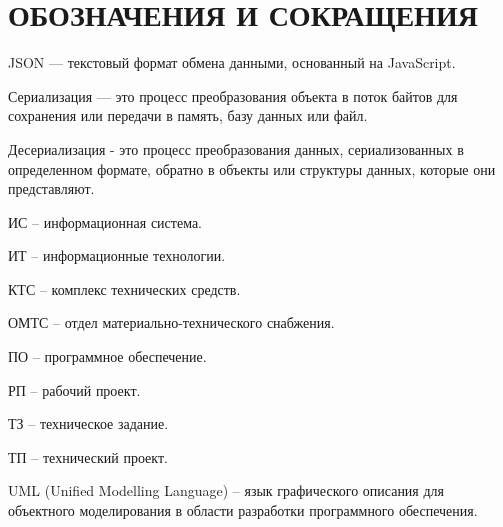 \section*{ОБОЗНАЧЕНИЯ И СОКРАЩЕНИЯ}

JSON — текстовый формат обмена данными, основанный на JavaScript.

Сериализация — это процесс преобразования объекта в поток байтов для сохранения или передачи в память, базу данных или файл.

Десериализация - это процесс преобразования данных, сериализованных в определенном формате, обратно в объекты или структуры данных, которые они представляют.

ИС -- информационная система.

ИТ -- информационные технологии. 

КТС -- комплекс технических средств.

ОМТС -- отдел материально-технического снабжения. 

ПО -- программное обеспечение.

РП -- рабочий проект.

ТЗ -- техническое задание.

ТП -- технический проект.

UML (Unified Modelling Language) -- язык графического описания для объектного моделирования в области разработки программного обеспечения.
